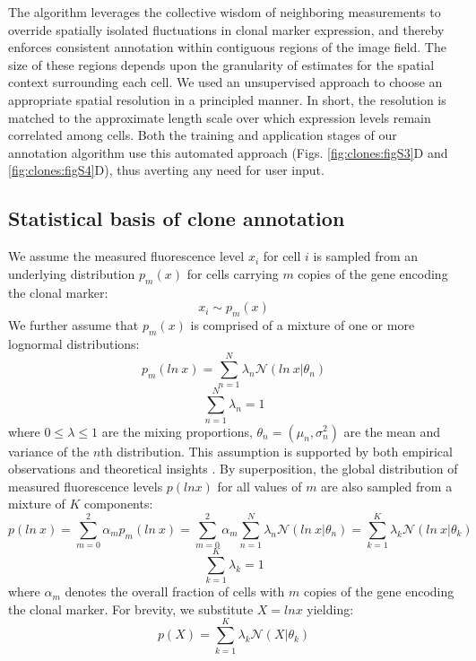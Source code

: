 The algorithm leverages the collective wisdom of neighboring measurements to override spatially isolated fluctuations in clonal marker expression, and thereby enforces consistent annotation within contiguous regions of the image field. The size of these regions depends upon the granularity of estimates for the spatial context surrounding each cell. We used an unsupervised approach to choose an appropriate spatial resolution in a principled manner. In short, the resolution is matched to the approximate length scale over which expression levels remain correlated among cells. Both the training and application stages of our annotation algorithm use this automated approach (Figs. \ref{fig:clones:figS3}D and \ref{fig:clones:figS4}D), thus averting any need for user input.

\subsection{Statistical basis of clone annotation} 
\label{clones:methods:annotation_math}

We assume the measured fluorescence level $x_i$ for cell $i$ is sampled from an underlying distribution $p_m(x)$ for cells carrying $m$ copies of the gene encoding the clonal marker:
\begin{equation}
x_i \sim p_m(x)
\end{equation}
We further assume that $p_m(x)$ is comprised of a mixture of one or more lognormal distributions:
\begin{equation}
p_m(ln\ x) = \sum^{N}_{n=1}\lambda_n \mathcal{N}(ln\ x|\theta_{n})
\end{equation}
\begin{equation}
\sum^{N}_{n=1}\lambda_n=1
\end{equation}
where $0 \leq \lambda \leq 1$ are the mixing proportions, $\theta_n=(\mu_n,\sigma_n^2)$ are the mean and variance of the $n$th distribution. This assumption is supported by both empirical observations and theoretical insights \cite{Furusawa2005,Beal2017}. By superposition, the global distribution of measured fluorescence levels $p(ln x)$ for all values of $m$ are also sampled from a mixture of $K$ components:
\begin{equation}
p(ln\ x) =  \sum^{2}_{m=0} \alpha_m p_m(ln\ x) = \sum^{2}_{m=0} \alpha_m 
\sum^{N}_{n=1}\lambda_n \mathcal{N}(ln\ x|\theta_{n}) = \sum^{K}_{k=1}\lambda_k \mathcal{N}(ln\ x|\theta_{k})
\end{equation}
\begin{equation}
\sum^{K}_{k=1}\lambda_k=1
\end{equation}
where $\alpha_m$ denotes the overall fraction of cells with $m$ copies of the gene encoding the clonal marker. For brevity, we substitute $X = ln x$ yielding:
\begin{equation}
p(X) = \sum^{K}_{k=1}\lambda_k \mathcal{N}(X|\theta_{k})
\end{equation}

